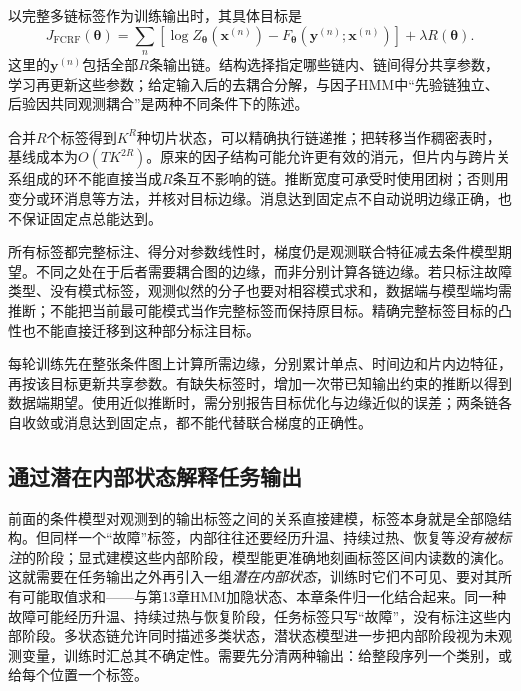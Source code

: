 以完整多链标签作为训练输出时，其具体目标是
\begin{equation}
  J_{\mathrm{FCRF}}(\bm\theta)
     =\sum_n[\log Z_{\bm\theta}(\bm x^{(n)})
                 -F_{\bm\theta}(\bm y^{(n)};\bm x^{(n)})]
       +\lambda R(\bm\theta).
  \label{eq:pgm-dynamic-undirected-factorial-objective}
\end{equation}
这里的$\bm y^{(n)}$包括全部$R$条输出链。结构选择指定哪些链内、链间得分共享参数，学习再更新这些参数；给定输入后的去耦合分解，与因子HMM中“先验链独立、后验因共同观测耦合”是两种不同条件下的陈述。

合并$R$个标签得到$K^R$种切片状态，可以精确执行链递推；把转移当作稠密表时，基线成本为$O(TK^{2R})$。原来的因子结构可能允许更有效的消元，但片内与跨片关系组成的环不能直接当成$R$条互不影响的链。推断宽度可承受时使用团树；否则用变分或环消息等方法，并核对目标边缘。消息达到固定点不自动说明边缘正确，也不保证固定点总能达到。

所有标签都完整标注、得分对参数线性时，梯度仍是观测联合特征减去条件模型期望。不同之处在于后者需要耦合图的边缘，而非分别计算各链边缘。若只标注故障类型、没有模式标签，观测似然的分子也要对相容模式求和，数据端与模型端均需推断；不能把当前最可能模式当作完整标签而保持原目标。精确完整标签目标的凸性也不能直接迁移到这种部分标注目标。

每轮训练先在整张条件图上计算所需边缘，分别累计单点、时间边和片内边特征，再按该目标更新共享参数。有缺失标签时，增加一次带已知输出约束的推断以得到数据端期望。使用近似推断时，需分别报告目标优化与边缘近似的误差；两条链各自收敛或消息达到固定点，都不能代替联合梯度的正确性。

\subsection{通过潜在内部状态解释任务输出}
\label{sec:pgm-dynamic-undirected-hidden-crf}

前面的条件模型对观测到的输出标签之间的关系直接建模，标签本身就是全部隐结构。但同样一个“故障”标签，内部往往还要经历升温、持续过热、恢复等\emph{没有被标注}的阶段；显式建模这些内部阶段，模型能更准确地刻画标签区间内读数的演化。这就需要在任务输出之外再引入一组\emph{潜在内部状态}，训练时它们不可见、要对其所有可能取值求和——与第13章HMM加隐状态、本章条件归一化结合起来。同一种故障可能经历升温、持续过热与恢复阶段，任务标签只写“故障”，没有标注这些内部阶段。多状态链允许同时描述多类状态，潜状态模型进一步把内部阶段视为未观测变量，训练时汇总其不确定性。需要先分清两种输出：给整段序列一个类别，或给每个位置一个标签。

